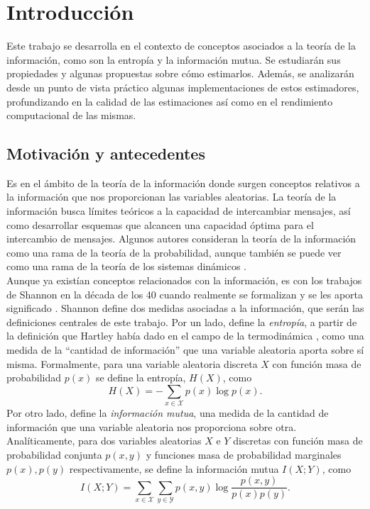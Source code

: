 \documentclass[12pt,a4paper]{report} %
\theoremstyle{definition}
\begin{document}






\begin{otherlanguage}{british}
  
\end{otherlanguage}

\tableofcontents
\newpage


\chapter{Introducción}

Este trabajo se desarrolla en el contexto de conceptos asociados a la teoría de la información, como son la entropía y la información mutua. Se estudiarán sus propiedades y algunas propuestas sobre cómo estimarlos. Además, se analizarán desde un punto de vista práctico algunas implementaciones de estos estimadores, profundizando en la calidad de las estimaciones así como en el rendimiento computacional de las mismas.\\

\section{Motivación y antecedentes}

Es en el ámbito de la teoría de la información donde surgen conceptos relativos a la información que nos proporcionan las variables aleatorias. La teoría de la información busca límites teóricos a la capacidad de intercambiar mensajes, así como desarrollar esquemas que alcancen una capacidad óptima para el intercambio de mensajes. Algunos autores consideran la teoría de la información como una rama de la teoría de la probabilidad, aunque también se puede ver como una rama de la teoría de los sistemas dinámicos \cite{gray}.\\

Aunque ya existían conceptos relacionados con la información, es con los trabajos de Shannon en la década de los 40 cuando realmente se formalizan y se les aporta significado \cite{shannon}. Shannon define dos medidas asociadas a la información, que serán las definiciones centrales de este trabajo. Por un lado, define la \textit{entropía}, a partir de la definición que Hartley había dado en el campo de la termodinámica \cite{hartley}, como una medida de la ``cantidad de información'' que una variable aleatoria aporta sobre sí misma. Formalmente, para una variable aleatoria discreta $X$ con función masa de probabilidad $p(x)$ se define la entropía, $H(X)$, como\[
H(X) = -\sum_{x\in \mathcal{X}}p(x)\log p(x).
\] Por otro lado, define la \textit{información mutua}, una medida de la cantidad de información que una variable aleatoria nos proporciona sobre otra. Analíticamente, para dos variables aleatorias $X$ e $Y$ discretas con función masa de probabilidad conjunta $p(x,y)$ y funciones masa de probabilidad marginales $p(x), p(y)$ respectivamente, se define la información mutua $I(X;Y)$, como\[
I(X;Y) = \sum_{x\in \mathcal{X}}\sum_{y \in \mathcal{Y}}p(x,y)\log\frac{p(x,y)}{p(x)p(y)}.
\]
\end{document}

